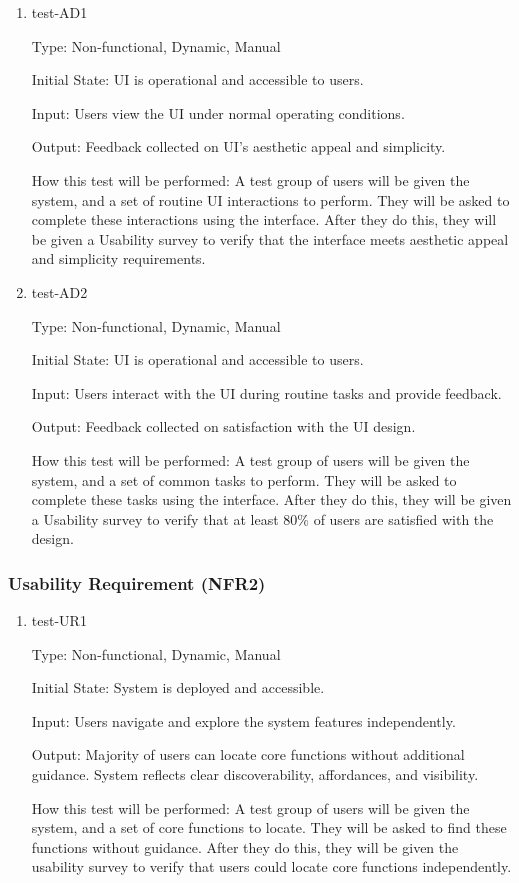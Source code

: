 \documentclass[12pt, titlepage]{article}
\begin{document}
\begin{enumerate}
    \item{test-AD1} \label{test-AD1}
    
    Type: Non-functional, Dynamic, Manual
    
    Initial State: UI is operational and accessible to users.
    
    Input: Users view the UI under normal operating conditions.
    
    Output: Feedback collected on UI's aesthetic appeal and simplicity.
    
    How this test will be performed: A test group of users will be given the system, and a set of routine UI interactions to perform. They will be asked to complete these interactions using the interface. After they do this, they will be given a Usability survey to verify that the interface meets aesthetic appeal and simplicity requirements.

    \item{test-AD2} \label{test-AD2}
    
    Type: Non-functional, Dynamic, Manual
    
    Initial State: UI is operational and accessible to users.
    
    Input: Users interact with the UI during routine tasks and provide feedback.
    
    Output: Feedback collected on satisfaction with the UI design.
    
    How this test will be performed: A test group of users will be given the system, and a set of common tasks to perform. They will be asked to complete these tasks using the interface. After they do this, they will be given a Usability survey to verify that at least 80\% of users are satisfied with the design.
\end{enumerate}

\subsubsection{Usability Requirement (NFR2)} \label{section:4.2.2}

\begin{enumerate}
    \item{test-UR1} \label{test-UR1}
    
    Type: Non-functional, Dynamic, Manual
    
    Initial State: System is deployed and accessible.
    
    Input: Users navigate and explore the system features independently.
    
    Output: Majority of users can locate core functions without additional guidance. System reflects clear discoverability, affordances, and visibility.
    
    How this test will be performed: A test group of users will be given the system, and a set of core functions to locate. They will be asked to find these functions without guidance. After they do this, they will be given the usability survey to verify that users could locate core functions independently.
\end{enumerate}
\end{document}
